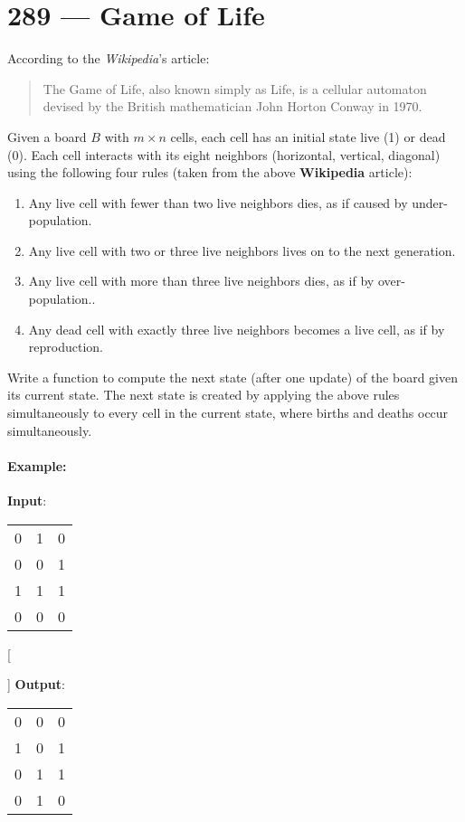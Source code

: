 \section{289 --- Game of Life}
According to the \textit{Wikipedia}'s article: 
\begin{quotation}
The Game of Life, also known simply as Life, is a cellular automaton devised by the British mathematician John Horton Conway in 1970.
\end{quotation}

Given a board $B$ with $m\times n$ cells, each cell has an initial state live (1) or dead (0). Each cell interacts with its eight neighbors (horizontal, vertical, diagonal) using the following four rules (taken from the above \textbf{Wikipedia} article):

\begin{enumerate}
\item Any live cell with fewer than two live neighbors dies, as if caused by under-population.
\item Any live cell with two or three live neighbors lives on to the next generation.
\item Any live cell with more than three live neighbors dies, as if by over-population..
\item Any dead cell with exactly three live neighbors becomes a live cell, as if by reproduction.
\end{enumerate}

Write a function to compute the next state (after one update) of the board given its current state. The next state is created by applying the above rules simultaneously to every cell in the current state, where births and deaths occur simultaneously.

\paragraph{Example:}

\begin{flushleft}
\textbf{Input}: 
\begin{table}[H]
\begin{tabular}{lll}
0 & 1 & 0\\
0 & 0 & 1\\
1 & 1 & 1\\
0 & 0 & 0
\end{tabular}
\end{table}
[

]
\textbf{Output}: 
\begin{table}[H]
\begin{tabular}{lll}
0 & 0 & 0\\
1 & 0 & 1\\
0 & 1 & 1\\
0 & 1 & 0
\end{tabular}
\end{table}
\end{flushleft}

